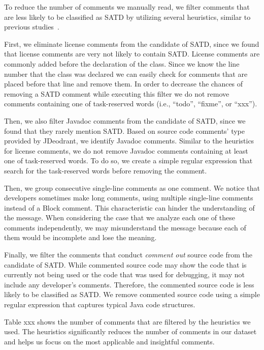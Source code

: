 \documentclass[conference]{IEEEtran}
\begin{document}
To reduce the number of comments we manually read, we filter comments that are less likely to be classified as SATD by utilizing several heuristics, similar to previous studies~\cite{Maldonado2015MTD}.

First, we eliminate license comments from the candidate of SATD, since we found that license comments are very not likely to contain SATD. License comments are commonly added before the declaration of the class. Since we know the line number that the class was declared we can easily check for comments that are placed before that line and remove them. In order to decrease the chances of removing a SATD comment while executing this filter we do not remove comments containing one of task-reserved words (i.e., “todo”, “fixme”, or “xxx”).

Then, we also filter Javadoc comments from the candidate of SATD, since we found that they rarely mention SATD. Based on source code comments' type provided by JDeodrant, we identify Javadoc comments. Similar to the heuristics for license comments, we do not remove Javadoc comments containing at least one of task-reserved words. To do so, we create a simple regular expression that search for the task-reserved words before removing the comment.

Then, we group consecutive single-line comments as one comment. We notice that developers sometimes make long comments, using multiple single-line comments instead of a Block comment. This characteristic can hinder the understanding of the message. When considering the case that we analyze each one of these comments independently, we may misunderstand the message because each of them would be incomplete and lose the meaning.

Finally, we filter the comments that conduct {\it comment out} source code from the candidate of SATD. While commented source code may show the code that is currently not being used or the code that was used for debugging, it may not include any developer's comments. Therefore, the commented source code is less likely to be classified as SATD. We remove commented source code using a simple regular expression that captures typical Java code structures.

Table xxx shows the number of comments that are filtered by the heuristics we used. The heuristics significantly reduces the number of comments in our dataset and helps us focus on the most applicable and insightful comments. 

\end{document}
